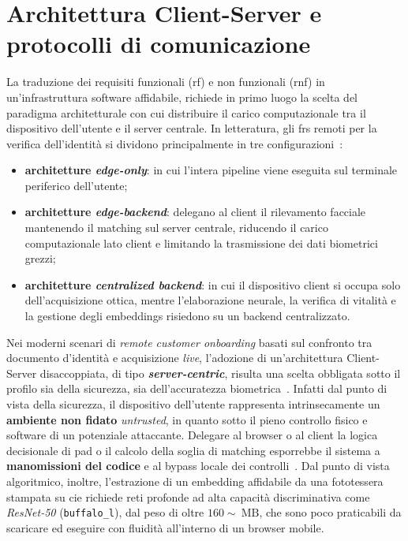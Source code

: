 \section{Architettura Client-Server e protocolli di comunicazione}\label{cap:2.2-architettura}
La traduzione dei requisiti funzionali (\gls{rf}) e non funzionali (\gls{rnf}) in un'infrastruttura software affidabile, richiede in primo luogo la scelta del paradigma architetturale con cui distribuire il carico computazionale tra il dispositivo dell'utente e il server centrale.
In letteratura, gli \gls{frs} remoti per la verifica dell'identità si dividono principalmente in tre configurazioni~\cite{sanzGoverningPrivacyPreservingFace2026}:
\begin{itemize}
    \item \textbf{architetture \textit{edge-only}}: in cui l'intera pipeline viene eseguita sul terminale periferico dell'utente;
    \item \textbf{architetture \textit{edge-backend}}: delegano al client il rilevamento facciale mantenendo il matching sul server centrale, riducendo il carico computazionale lato client e limitando la trasmissione dei dati biometrici grezzi;
    \item \textbf{architetture \textit{centralized backend}}: in cui il dispositivo client si occupa solo dell'acquisizione ottica, mentre l'elaborazione neurale, la verifica di vitalità e la gestione degli embeddings risiedono su un backend centralizzato.
\end{itemize}
Nei moderni scenari di \textit{remote customer onboarding} basati sul confronto tra documento d'identità e acquisizione \textit{live}, l'adozione di un'architettura Client-Server disaccoppiata, di tipo \textbf{\textit{server-centric}}, risulta una scelta obbligata sotto il profilo sia della sicurezza, sia dell'accuratezza biometrica~\cite{sawetsutipunFacialImageVerification2020a}. 
Infatti dal punto di vista della sicurezza, il dispositivo dell'utente rappresenta intrinsecamente un \textbf{ambiente non fidato} \textit{untrusted}, in quanto sotto il pieno controllo fisico e software di un potenziale attaccante. Delegare al browser o al client la logica decisionale di \gls{pad} o il calcolo della soglia di matching esporrebbe il sistema a \textbf{manomissioni del codice} e al bypass locale dei controlli~\cite{groupBiometricLivenessPresentation}. 
Dal punto di vista algoritmico, inoltre, l'estrazione di un embedding affidabile da una fototessera stampata su \gls{cie} richiede reti profonde ad alta capacità discriminativa come \textit{ResNet-50} (\texttt{buffalo\_l}), dal peso di oltre $160\sim~\text{MB}$, che sono poco praticabili da scaricare ed eseguire con fluidità all'interno di un browser mobile. 
